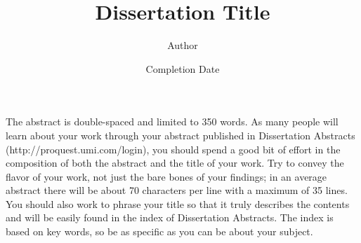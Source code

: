 \documentclass{iuphd}
\begin{document}
\title{Dissertation Title}
\author{Author}
\date{Completion Date}
\maketitle

\acceptancepage


% 


\begin{abstract*}
 The abstract is double-spaced and limited to 350 words. As many people will learn about
your work through your abstract published in Dissertation Abstracts (http://proquest.umi.com/login),
you should spend a good bit of effort in the composition of both the abstract and the title of your work.
Try to convey the flavor of your work, not just the bare bones of your findings; in an average abstract
there will be about 70 characters per line with a maximum of 35 lines. You should also work to phrase your
title so that it truly describes the contents and will be easily found in the index of Dissertation Abstracts.
The index is based on key words, so be as specific as you can be about your subject. 
\end{abstract*}

\tableofcontents






% 
% 
\end{document}
